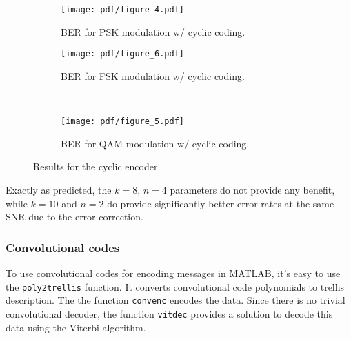 \begin{figure}
    \centering
    \begin{subfigure}[t]{0.48\columnwidth}
        \centering
        \texttt{[image: pdf/figure\_4.pdf]}
        \caption{BER for PSK modulation w/ cyclic coding.
            \label{fig:pskcrc}}
    \end{subfigure} \hfill
    \begin{subfigure}[t]{0.48\columnwidth}
        \centering
        \texttt{[image: pdf/figure\_6.pdf]}
        \caption{BER for FSK modulation w/ cyclic coding.
            \label{fig:fskcrc}}
    \end{subfigure} \\
    \begin{subfigure}[t]{\columnwidth}
        \centering
        \texttt{[image: pdf/figure\_5.pdf]}
        \caption{BER for QAM modulation w/ cyclic coding.
            \label{fig:qamcrc}}
    \end{subfigure}
    \caption{Results for the cyclic encoder.}
\end{figure}
Exactly as predicted, the \(k=8\), \(n=4\) parameters do not provide any benefit,
while \(k=10\) and \(n=2\) do provide significantly better error rates at the same
SNR due to the error correction.

\subsubsection{Convolutional codes}

To use convolutional codes for encoding messages in MATLAB, it's easy to use the
{\tt poly2trellis} function. It converts convolutional code polynomials to trellis
description. The the function {\tt convenc} encodes the data. Since there is no
trivial convolutional decoder, the function {\tt vitdec} provides a solution to
decode this data using the Viterbi algorithm.


